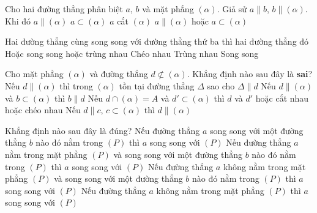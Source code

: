 \begin{ex}%
	Cho hai đường thẳng phân biệt $ a$, $b$ và mặt phẳng $( \alpha)$. Giả sử $ a \parallel b$, $ b \parallel ( \alpha)$. Khi  đó
	\choice 
		{$  a \parallel ( \alpha) $}
		{$ a  \subset ( \alpha) $}
		 {$ a$ cắt $( \alpha) $}
		{\True $ a \parallel ( \alpha)$ hoặc $ a  \subset ( \alpha) $}
\end{ex}

\begin{ex}%
	Hai  đường thẳng cùng song song với đường thẳng thứ ba thì hai đường thẳng đó
	 \choice
		{\True Hoặc song song hoặc trùng nhau} 
		{Chéo  nhau}
		{Trùng  nhau}
		{Song song} 
\end{ex}

\begin{ex}%
	 Cho mặt phẳng $(\alpha)$ và đường thẳng $d\not\subset (\alpha)$. Khẳng định nào sau đây là \textbf{sai}?
	\choice 
		{Nếu $d \parallel (\alpha)$ thì  trong $(\alpha)$ tồn tại đường thẳng $\Delta$ sao cho $\Delta \parallel d$}
		{\True Nếu $d \parallel (\alpha)$ và $b\subset (\alpha)$ thì $b  \parallel d$}
		{Nếu $d\cap (\alpha)=A$ và $d'\subset (\alpha)$  thì $d$ và $d'$ hoặc cắt nhau hoặc chéo nhau}
		 {Nếu $d \parallel c$, $c\subset (\alpha)$ thì $d \parallel (\alpha)$}
\end{ex}

\begin{ex}%
	Khẳng định nào sau đây là đúng? 
	\choice 
		{Nếu đường thẳng $a$ song song với một đường thẳng $b$ nào đó nằm trong $\left(P\right)$ thì $a$  song song với $\left(P\right)$}
		{Nếu đường thẳng $a$ nằm trong mặt phẳng $\left(P\right)$ và song song với một đường thẳng $b$ nào đó nằm trong $\left(P\right)$ thì $a$ song song với $\left(P\right)$} 
		{\True Nếu đường thẳng $a$ không nằm trong mặt phẳng $\left(P\right)$ và song song với một đường thẳng  $b$ nào đó nằm trong $\left(P\right)$ thì $a$ song song với $\left(P\right)$}
		{Nếu đường thẳng $a$ không nằm trong mặt phẳng $\left(P\right)$ thì $a$ song song  với $\left(P\right)$}
\end{ex}

